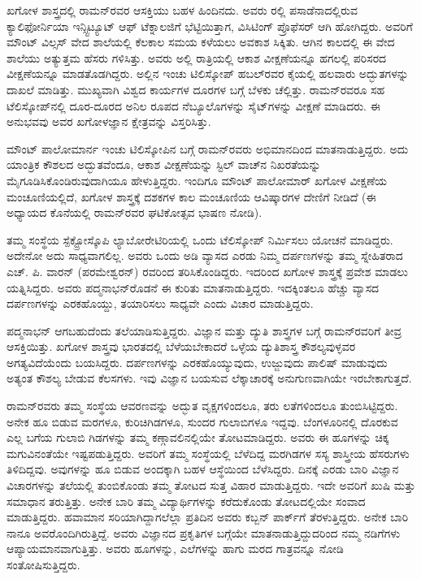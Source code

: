 ಖಗೋಳ ಶಾಸ್ತ್ರದಲ್ಲಿ ರಾಮನ್‌ರವರ ಆಸಕ್ತಿಯು ಬಹಳ ಹಿಂದಿನದು. ಅವರು  ರಲ್ಲಿ ಪಸಾಡೆನಾದಲ್ಲಿರುವ ಕ್ಯಾಲಿಫೋರ್ನಿಯಾ ಇನ್ಸ್ಟಿಟ್ಯೂಟ್ ಆಫ್ ಟೆಕ್ನಾಲಜಿಗೆ ಭೆಟ್ಟಿಯಿತ್ತಾಗ, ವಿಸಿಟಿಂಗ್ ಪ್ರೊಫೆಸರ್ ಆಗಿ ಹೋಗಿದ್ದರು. ಅವರಿಗೆ ಮೌಂಟ್ ವಿಲ್ಸಸ್ ವೇದ ಶಾಲೆಯಲ್ಲಿ ಕೆಲಕಾಲ ಸಮಯ ಕಳೆಯಲು ಅವಕಾಶ ಸಿಕ್ಕಿತು. ಆಗಿನ ಕಾಲದಲ್ಲಿ ಈ ವೇದ ಶಾಲೆಯು ಅತ್ಯುತ್ತಮ ಹೆಸರು ಗಳಿಸಿತ್ತು. ಅವರು ಅಲ್ಲಿ ರಾತ್ರಿಯಲ್ಲಿ ಆಕಾಶ ವೀಕ್ಷಣೆಯನ್ನೂ ಹಗಲಲ್ಲಿ ಪರಿಸರದ ವೀಕ್ಷಣೆಯನ್ನೂ ಮಾಡತೊಡಗಿದ್ದರು. ಅಲ್ಲಿನ  ಇಂಚು ಟಿಲಿಸ್ಕೋಪ್ ಹಬಲ್‌ರವರ ಕೈಯಲ್ಲಿ ಹಲವಾರು ಅದ್ಭುತಗಳನ್ನು ದಾಖಲೆ ಮಾಡಿತ್ತು. ಮುಖ್ಯವಾಗಿ ವಿಶ್ವದ ಕಾರ್ಯಗಳ ದೂರಗಳ ಬಗ್ಗೆ ಬೆಳಕು ಚೆಲ್ಲಿತ್ತು. ರಾಮನ್‌ರವರೂ ಸಹ ಟೆಲಿಸ್ಕೋಪ್‌ನಲ್ಲಿ ದೂರ-ದೂರದ ಅನಿಲ ರೂಪದ ನೆಬ್ಯೂಲೊಗಳನ್ನು ಸೈಟ್‌ಗಳನ್ನು ವೀಕ್ಷಣೆ ಮಾಡಿದರು. ಈ ಅನುಭವವು ಅವರ ಖಗೋಳಜ್ಞಾನ ಕ್ಷೇತ್ರವನ್ನು ವಿಸ್ತರಿಸಿತ್ತು.

ಮೌಂಟ್ ಪಾಲೋಮಾರ್ನ  ಇಂಚು ಟಿಲಿಸ್ಕೋಪಿನ ಬಗ್ಗೆ ರಾಮನ್‌ರವರು ಅಭಿಮಾನದಿಂದ ಮಾತನಾಡುತ್ತಿದ್ದರು. ಅದು ಯಾಂತ್ರಿಕ ಕೌಶಲದ ಅದ್ಭುತವೆಂದೂ, ಆಕಾಶ ವೀಕ್ಷಣೆಯನ್ನು ಸ್ಟಿಲ್ ವಾಚ್‍ನ ನಿಖರತೆಯನ್ನು ಮೈಗೂಡಿಸಿಕೊಂಡಿರುವುದಾಗಿಯೂ ಹೇಳುತ್ತಿದ್ದರು. ಇಂದಿಗೂ ಮೌಂಟ್ ಪಾಲೋಮಾರ್ ಖಗೋಳ ವೀಕ್ಷಣೆಯ ಮಂಚೂಣಿಯಲ್ಲಿದೆ, ಖಗೋಳ ಶಾಸ್ತ್ರಕ್ಕೆ ದಶಕಗಳ ಕಾಲ ಮಂಚೂಣಿಯ ಆವಿಷ್ಕಾರಗಳ ದೇಣಿಗೆ ನೀಡಿದೆ (ಈ ಅಧ್ಯಾಯದ ಕೊನೆಯಲ್ಲಿ ರಾಮನ್‌ರವರ ಘಟಿಕೋತ್ಸವ ಭಾಷಣ ನೋಡಿ).

ತಮ್ಮ ಸಂಸ್ಥೆಯ ಸ್ಪೆಕ್ಟ್ರೋಸ್ಕೊಪಿ ಲ್ಯಾಬೋರೇಟಿರಿಯಲ್ಲಿ ಒಂದು ಟೆಲಿಸ್ಕೋಪ್ ನಿರ್ಮಿಸಲು ಯೋಚನೆ ಮಾಡಿದ್ದರು. ಅದೇನೋ ಅದು ಸಾಧ್ಯವಾಗಲಿಲ್ಲ. ಅವರು ಒಂದು ಅಡಿ ವ್ಯಾಸದ ಎರಡು ನಿಮ್ಮ ದರ್ಪಣಗಳನ್ನು ತಮ್ಮ ಸ್ನೇಹಿತರಾದ ಎಚ್. ಪಿ. ವಾರನ್ (ಪರಮೇಶ್ವರನ್) ರವರಿಂದ ತರಿಸಿಕೊಂಡಿದ್ದರು. ಇದರಿಂದ ಖಗೋಳ ಶಾಸ್ತ್ರಕ್ಕೆ ಪ್ರವೇಶ ಮಾಡಲು ಯತ್ನಿಸಿದ್ದರು. ಅವರು ಪದ್ಮನಾಭನ್‌ರೊಡನೆ ಈ ಕುರಿತು ಮಾತನಾಡುತ್ತಿದ್ದರು. ಇದಕ್ಕಿಂತಲೂ ಹೆಚ್ಚು ವ್ಯಾಸದ ದರ್ಪಣಗಳನ್ನು ಎರಕಹೊಯ್ದು, ತಯಾರಿಸಲು ಸಾಧ್ಯವೇ ಎಂದು ವಿಚಾರ ಮಾಡುತ್ತಿದ್ದರು. 

ಪದ್ಮನಾಭನ್ ಆಗಬಹುದೆಂದು ತಲೆಯಾಡಿಸುತ್ತಿದ್ದರು. ವಿಜ್ಞಾನ ಮತ್ತು ದ್ಯುತಿ ಶಾಸ್ತ್ರಗಳ ಬಗ್ಗೆ ರಾಮನ್‍ರವರಿಗೆ ತೀವ್ರ ಆಸಕ್ತಿಯಿತ್ತು. ಖಗೋಳ ಶಾಸ್ತ್ರವು ಭಾರತದಲ್ಲಿ ಬೆಳೆಯಬೇಕಾದರೆ ಒಳ್ಳೆಯ ದ್ಯುತಿಶಾಸ್ತ್ರ ಕೌಶಲ್ಯವುಳ್ಳವರ ಅಗತ್ಯವಿದೆಯೆಂದು ಬಯಸಿದ್ದರು. ದರ್ಪಣಗಳನ್ನು ಎರಕಹೊಯ್ಯುವುದು, ಉಜ್ಜುವುದು ಪಾಲಿಷ್ ಮಾಡುವುದು ಅತ್ಯಂತ ಕೌಶಲ್ಯ ಬೇಡುವ ಕೆಲಸಗಳು. ಇವು ವಿಜ್ಞಾನ ಬಯಸುವ ಲೆಕ್ಕಾಚಾರಕ್ಕೆ ಅನುಗುಣವಾಗಿಯೇ ಇರಬೇಕಾಗುತ್ತದೆ.

ರಾಮನ್‌ರವರು ತಮ್ಮ ಸಂಸ್ಥೆಯ ಆವರಣವನ್ನು ಅದ್ಭುತ ವೃಕ್ಷಗಳಿಂದಲೂ, ತರು ಲತೆಗಳಿಂದಲೂ ತುಂಬಿಸಿಟ್ಟಿದ್ದರು. ಅನೇಕ ಹೂ ಬಿಡುವ ಮರಗಳೂ, ಕುರಿಚಿಗಿಡಗಳೂ, ಸುಂದರ ಗುಲಾಬಿಗಳೂ ಇದ್ದವು. ಬೆಂಗಳೂರಿನಲ್ಲಿ ದೊರಕುವ ಎಲ್ಲ ಬಗೆಯ ಗುಲಾಬಿ ಗಿಡಗಳನ್ನು ತಮ್ಮ ಕಣ್ಗಾವಲಿನಲ್ಲಿಯೇ ತೋಟಮಾಡಿದ್ದರು. ಅವರು ಈ ಹೂಗಳನ್ನು ಚಿಕ್ಕ ಮಗುವಿನಂತೆಯೇ ಇಷ್ಟಪಡುತ್ತಿದ್ದರು. ಅವರಿಗೆ ತಮ್ಮ ಸಂಸ್ಥೆಯಲ್ಲಿ ಬೆಳೆದಿದ್ದ ಮರಗಿಡಗಳ ಸಸ್ಯ ಶಾಸ್ತ್ರೀಯ ಹೆಸರುಗಳು ತಿಳಿದಿದ್ದವು. ಅವುಗಳನ್ನು ಹೂ ಬಿಡುವ ಅಂದಕ್ಕಾಗಿ ಬಹಳ ಆಸ್ಥೆಯಿಂದ ಬೆಳೆಸಿದ್ದರು. ದಿನಕ್ಕೆ ಎರಡು ಬಾರಿ ವಿಜ್ಞಾನ ವಿಚಾರಗಳನ್ನು ತಲೆಯಲ್ಲಿ ತುಂಬಿಕೊಂಡು ತಮ್ಮ ತೋಟದ ಸುತ್ತ ವಿಹಾರ ಮಾಡುತ್ತಿದ್ದರು. ಇದೇ ಅವರಿಗೆ ಖುಷಿ ಮತ್ತು ಸಮಾಧಾನ ತರುತ್ತಿತ್ತು. ಅನೇಕ ಬಾರಿ ತಮ್ಮ ವಿದ್ಯಾರ್ಥಿಗಳನ್ನು ಕರೆದುಕೊಂಡು ತೋಟದಲ್ಲಿಯೇ ಸಂವಾದ ಮಾಡುತ್ತಿದ್ದರು. ಹವಾಮಾನ ಸರಿಯಾಗಿದ್ದಾಗಲೆಲ್ಲಾ ಪ್ರತಿದಿನ ಅವರು ಕಬ್ಬನ್ ಪಾರ್ಕ್‌ಗೆ ತೆರಳುತ್ತಿದ್ದರು. ಅನೇಕ ಬಾರಿ ನಾನೂ ಅವರೊಂದಿಗಿರುತ್ತಿದ್ದೆ. ಅವರು ವಿಜ್ಞಾನದ ಪ್ರಕೃತಿಗಳ ಬಗ್ಗೆಯೇ ಮಾತನಾಡುತ್ತಿದ್ದುದರಿಂದ ನಮ್ಮ ನಡಿಗೆಗಳು ಆಪ್ಯಾಯಮಾನವಾಗುತ್ತಿತ್ತು. ಅವರು ಹೂಗಳನ್ನು, ಎಲೆಗಳನ್ನು ಹಾಗು ಮರದ ಗಾತ್ರವನ್ನೂ ನೋಡಿ ಸಂತೋಷಿಸುತ್ತಿದ್ದರು. 

